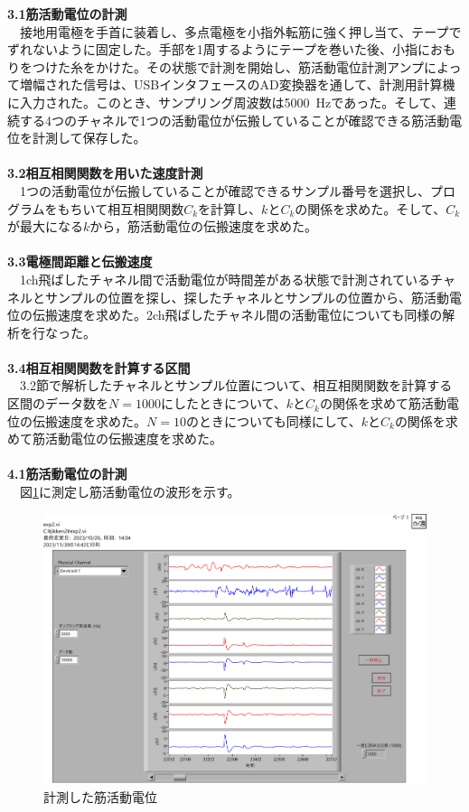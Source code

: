 \documentclass[a4paper,10.5pt]{ltjsarticle}
\begin{document}
{\large \bfseries 3.1筋活動電位の計測}\\
　接地用電極を手首に装着し、多点電極を小指外転筋に強く押し当て、テープでずれないように固定した。手部を1周するようにテープを巻いた後、小指におもりをつけた糸をかけた。その状態で計測を開始し、筋活動電位計測アンプによって増幅された信号は、USBインタフェースのAD変換器を通して、計測用計算機に入力された。このとき、サンプリング周波数は5000\ Hzであった。そして、連続する4つのチャネルで1つの活動電位が伝搬していることが確認できる筋活動電位を計測して保存した。\\
\\
{\large \bfseries 3.2相互相関関数を用いた速度計測}\\
　1つの活動電位が伝搬していることが確認できるサンプル番号を選択し、プログラムをもちいて相互相関関数$C_k$を計算し、$k$と$C_k$の関係を求めた。そして、$C_k$が最大になる$k$から，筋活動電位の伝搬速度を求めた。\\
\\
{\large \bfseries 3.3電極間距離と伝搬速度}\\
　1ch飛ばしたチャネル間で活動電位が時間差がある状態で計測されているチャネルとサンプルの位置を探し、探したチャネルとサンプルの位置から、筋活動電位の伝搬速度を求めた。2ch飛ばしたチャネル間の活動電位についても同様の解析を行なった。\\
\\
{\large \bfseries 3.4相互相関関数を計算する区間}\\
　3.2節で解析したチャネルとサンプル位置について、相互相関関数を計算する区間のデータ数を$N =1000$にしたときについて、$k$と$C_k$の関係を求めて筋活動電位の伝搬速度を求めた。$N=10$のときについても同様にして、$k$と$C_k$の関係を求めて筋活動電位の伝搬速度を求めた。\\
\clearpage
\hspace{-2pt}{\Large \bfseries 4.結果}\\
{\large \bfseries 4.1筋活動電位の計測}\\
　図\ref{musclewave}に測定し筋活動電位の波形を示す。
\begin{figure}[h]
  \centering
  \includegraphics[scale=0.3]{figure1.pdf}
  \caption{計測した筋活動電位}
  \label{musclewave}
\end{figure}\\
\end{document}
